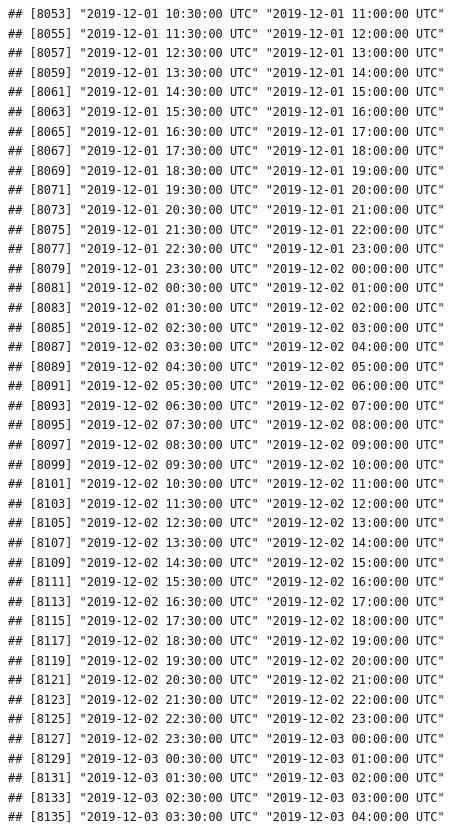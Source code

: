 \documentclass{article}\usepackage[]{graphicx}\usepackage[]{color}
\makeatletter
\newenvironment{kframe}{%
 \def\at@end@of@kframe{}%
 \ifinner\ifhmode%
  \def\at@end@of@kframe{\end{minipage}}%
  \begin{minipage}{\columnwidth}%
 \fi\fi%
 \def\FrameCommand##1{\hskip\@totalleftmargin \hskip-\fboxsep
 \colorbox{shadecolor}{##1}\hskip-\fboxsep
     \hskip-\linewidth \hskip-\@totalleftmargin \hskip\columnwidth}%
 \MakeFramed {\advance\hsize-\width
   \@totalleftmargin\z@ \linewidth\hsize
   \@setminipage}}%
 {\par\unskip\endMakeFramed%
 \at@end@of@kframe}
\newenvironment{knitrout}{}{} %
\makeatother
\begin{document}
\begin{knitrout}
\begin{kframe}
\begin{verbatim}
## [8053] "2019-12-01 10:30:00 UTC" "2019-12-01 11:00:00 UTC"
## [8055] "2019-12-01 11:30:00 UTC" "2019-12-01 12:00:00 UTC"
## [8057] "2019-12-01 12:30:00 UTC" "2019-12-01 13:00:00 UTC"
## [8059] "2019-12-01 13:30:00 UTC" "2019-12-01 14:00:00 UTC"
## [8061] "2019-12-01 14:30:00 UTC" "2019-12-01 15:00:00 UTC"
## [8063] "2019-12-01 15:30:00 UTC" "2019-12-01 16:00:00 UTC"
## [8065] "2019-12-01 16:30:00 UTC" "2019-12-01 17:00:00 UTC"
## [8067] "2019-12-01 17:30:00 UTC" "2019-12-01 18:00:00 UTC"
## [8069] "2019-12-01 18:30:00 UTC" "2019-12-01 19:00:00 UTC"
## [8071] "2019-12-01 19:30:00 UTC" "2019-12-01 20:00:00 UTC"
## [8073] "2019-12-01 20:30:00 UTC" "2019-12-01 21:00:00 UTC"
## [8075] "2019-12-01 21:30:00 UTC" "2019-12-01 22:00:00 UTC"
## [8077] "2019-12-01 22:30:00 UTC" "2019-12-01 23:00:00 UTC"
## [8079] "2019-12-01 23:30:00 UTC" "2019-12-02 00:00:00 UTC"
## [8081] "2019-12-02 00:30:00 UTC" "2019-12-02 01:00:00 UTC"
## [8083] "2019-12-02 01:30:00 UTC" "2019-12-02 02:00:00 UTC"
## [8085] "2019-12-02 02:30:00 UTC" "2019-12-02 03:00:00 UTC"
## [8087] "2019-12-02 03:30:00 UTC" "2019-12-02 04:00:00 UTC"
## [8089] "2019-12-02 04:30:00 UTC" "2019-12-02 05:00:00 UTC"
## [8091] "2019-12-02 05:30:00 UTC" "2019-12-02 06:00:00 UTC"
## [8093] "2019-12-02 06:30:00 UTC" "2019-12-02 07:00:00 UTC"
## [8095] "2019-12-02 07:30:00 UTC" "2019-12-02 08:00:00 UTC"
## [8097] "2019-12-02 08:30:00 UTC" "2019-12-02 09:00:00 UTC"
## [8099] "2019-12-02 09:30:00 UTC" "2019-12-02 10:00:00 UTC"
## [8101] "2019-12-02 10:30:00 UTC" "2019-12-02 11:00:00 UTC"
## [8103] "2019-12-02 11:30:00 UTC" "2019-12-02 12:00:00 UTC"
## [8105] "2019-12-02 12:30:00 UTC" "2019-12-02 13:00:00 UTC"
## [8107] "2019-12-02 13:30:00 UTC" "2019-12-02 14:00:00 UTC"
## [8109] "2019-12-02 14:30:00 UTC" "2019-12-02 15:00:00 UTC"
## [8111] "2019-12-02 15:30:00 UTC" "2019-12-02 16:00:00 UTC"
## [8113] "2019-12-02 16:30:00 UTC" "2019-12-02 17:00:00 UTC"
## [8115] "2019-12-02 17:30:00 UTC" "2019-12-02 18:00:00 UTC"
## [8117] "2019-12-02 18:30:00 UTC" "2019-12-02 19:00:00 UTC"
## [8119] "2019-12-02 19:30:00 UTC" "2019-12-02 20:00:00 UTC"
## [8121] "2019-12-02 20:30:00 UTC" "2019-12-02 21:00:00 UTC"
## [8123] "2019-12-02 21:30:00 UTC" "2019-12-02 22:00:00 UTC"
## [8125] "2019-12-02 22:30:00 UTC" "2019-12-02 23:00:00 UTC"
## [8127] "2019-12-02 23:30:00 UTC" "2019-12-03 00:00:00 UTC"
## [8129] "2019-12-03 00:30:00 UTC" "2019-12-03 01:00:00 UTC"
## [8131] "2019-12-03 01:30:00 UTC" "2019-12-03 02:00:00 UTC"
## [8133] "2019-12-03 02:30:00 UTC" "2019-12-03 03:00:00 UTC"
## [8135] "2019-12-03 03:30:00 UTC" "2019-12-03 04:00:00 UTC"

\end{verbatim}
\end{kframe}
\end{knitrout}
\end{document}
